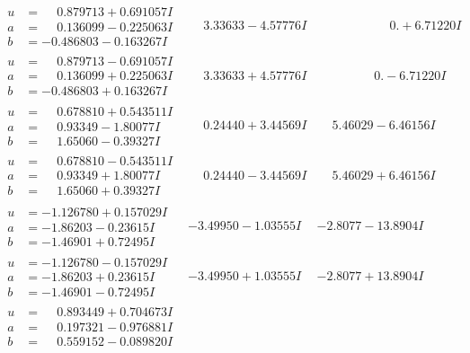 \documentclass[1p]{elsarticle_modified}
\theoremstyle{definition}
\begin{document}
$$\begin{array}{c|c|c}
\begin{aligned}
u &= \phantom{-}0.879713 + 0.691057 I \\
a &= \phantom{-}0.136099 - 0.225063 I \\
b &= -0.486803 - 0.163267 I\end{aligned}
 & \phantom{-}3.33633 - 4.57776 I & \phantom{-0.000000 -}0. + 6.71220 I \\ \hline\begin{aligned}
u &= \phantom{-}0.879713 - 0.691057 I \\
a &= \phantom{-}0.136099 + 0.225063 I \\
b &= -0.486803 + 0.163267 I\end{aligned}
 & \phantom{-}3.33633 + 4.57776 I & \phantom{-0.000000 } 0. - 6.71220 I \\ \hline\begin{aligned}
u &= \phantom{-}0.678810 + 0.543511 I \\
a &= \phantom{-}0.93349 - 1.80077 I \\
b &= \phantom{-}1.65060 - 0.39327 I\end{aligned}
 & \phantom{-}0.24440 + 3.44569 I & \phantom{-}5.46029 - 6.46156 I \\ \hline\begin{aligned}
u &= \phantom{-}0.678810 - 0.543511 I \\
a &= \phantom{-}0.93349 + 1.80077 I \\
b &= \phantom{-}1.65060 + 0.39327 I\end{aligned}
 & \phantom{-}0.24440 - 3.44569 I & \phantom{-}5.46029 + 6.46156 I \\ \hline\begin{aligned}
u &= -1.126780 + 0.157029 I \\
a &= -1.86203 - 0.23615 I \\
b &= -1.46901 + 0.72495 I\end{aligned}
 & -3.49950 - 1.03555 I & -2.8077 - 13.8904 I \\ \hline\begin{aligned}
u &= -1.126780 - 0.157029 I \\
a &= -1.86203 + 0.23615 I \\
b &= -1.46901 - 0.72495 I\end{aligned}
 & -3.49950 + 1.03555 I & -2.8077 + 13.8904 I \\ \hline\begin{aligned}
u &= \phantom{-}0.893449 + 0.704673 I \\
a &= \phantom{-}0.197321 - 0.976881 I \\
b &= \phantom{-}0.559152 - 0.089820 I\end{aligned}

\end{array}$$
\end{document}

